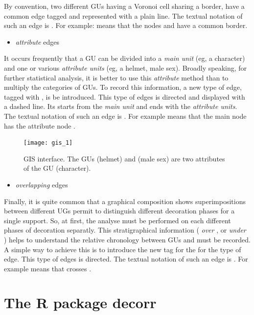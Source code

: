 \documentclass[article]{jss}\usepackage{knitr}
\begin{document}
By convention, two different GUs having a Voronoi cell sharing a border, have a common edge tagged  and represented with a plain line. The textual notation of such an edge is . For example:  means that the nodes  and  have a common border.

\begin{itemize}
  \item \emph{attribute} edges
\end{itemize}

It occurs frequently that a GU can be divided into a \emph{main unit} (eg, a character) and one or various \emph{attribute units} (eg, a helmet, male sex). Broadly speaking, for further statistical analysis, it is better to use this \emph{attribute} method than to multiply the categories of GUs. To record this information, a new type of edge, tagged with , is be introduced. This type of edges is directed and displayed with a dashed line. Its starts from the \emph{main unit} and ends with the \emph{attribute units}. The textual notation of such an edge is . For example  means that the main node  has the attribute node .

\begin{figure}[H] 
\centering
\texttt{[image: gis\_1]}
\caption{\label{fig:gis1} GIS interface. The GUs  (helmet) and  (male sex) are two attributes of the GU  (character).}
\end{figure}

\begin{itemize}
  \item \emph{overlapping} edges
\end{itemize}

Finally, it is quite common that a graphical composition shows superimpositions between different UGs permit to distinguish different decoration phases for a single support. So, at first, the analyse must be performed on each different phases of decoration separatly. This stratigraphical information ( \emph{over} , or  \emph{under} ) helps to understand the relative chronology between GUs and must be recorded. A simple way to achieve this is to introduce the new tag  for the for the type of edge. This type of edges is directed. The textual notation of such an edge is . For example  means that  crosses .

\section{The R package decorr} \label{sec:models}
\end{document}
